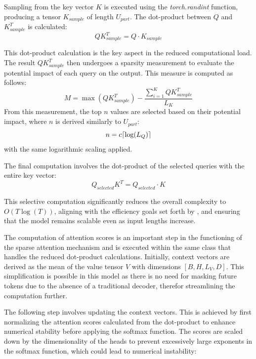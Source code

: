 \documentclass{article}
\DeclarePairedDelimiter{\ceil}{\lceil}{\rceil}
\begin{document}
Sampling from the key vector $K$ is executed using the \textit{torch.randint} function, producing a tensor $K_{sample}$ of length $U_{part}$. The dot-product between $Q$ and $K_{sample}^T$ is calculated:
\begin{equation}
    QK^T_{sample} = Q \cdot K_{sample}
\end{equation}

This dot-product calculation is the key aspect in the reduced computational load. The result $QK^T_{sample}$ then undergoes a sparsity measurement to evaluate the potential impact of each query on the output. This measure is computed as follows:
\begin{equation}
    M = \max(QK^T_{sample}) - \frac{\sum^K_{i=1} QK^T_{sample}}{L_K}
\end{equation}
From this measurement, the top $n$ values are selected based on their potential impact, where $n$ is derived similarly to $U_{part}$:
\begin{equation}
    n = c \ceil*{\log(L_Q)}
\end{equation}
with the same logarithmic scaling applied.

The final computation involves the dot-product of the selected queries with the entire key vector:
\begin{equation}
    Q_{selected}K^T = Q_{selected} \cdot K
\end{equation}

This selective computation significantly reduces the overall complexity to $O(T \log(T))$, aligning with the efficiency goals set forth by \cite{Informer}, and ensuring that the model remains scalable even as input lengths increase.


The computation of attention scores is an important step in the functioning of the sparse attention mechanism and is executed within the same class that handles the reduced dot-product calculations. Initially, context vectors are derived as the mean of the value tensor $V$ with dimensions $[B,H,L_V,D]$. This simplification is possible in this model as there is no need for masking future tokens due to the absence of a traditional decoder, therefor streamlining the computation further.

The following step involves updating the context vectors. This is achieved by first normalizing the attention scores calculated from the dot-product to enhance numerical stability before applying the softmax function. The scores are scaled down by the dimensionality of the heads to prevent excessively large exponents in the softmax function, which could lead to numerical instability:
\end{document}
